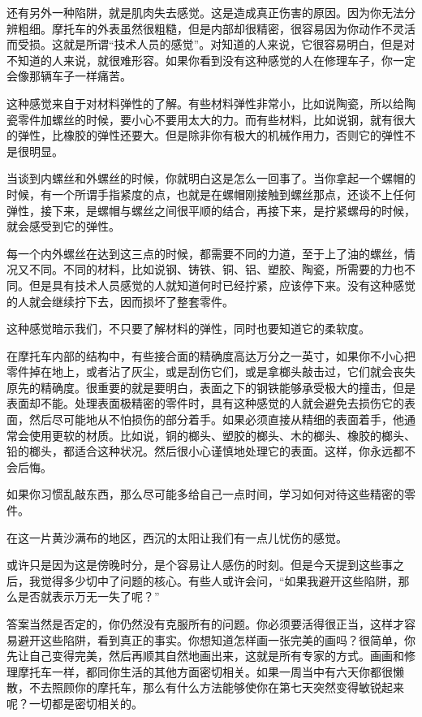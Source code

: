 \documentclass[UTF8]{article}
\begin{document}
\par 还有另外一种陷阱，就是肌肉失去感觉。这是造成真正伤害的原因。因为你无法分辨粗细。摩托车的外表虽然很粗糙，但是内部却很精密，很容易因为你动作不灵活而受损。这就是所谓“技术人员的感觉”。对知道的人来说，它很容易明白，但是对不知道的人来说，就很难形容。如果你看到没有这种感觉的人在修理车子，你一定会像那辆车子一样痛苦。
\par 这种感觉来自于对材料弹性的了解。有些材料弹性非常小，比如说陶瓷，所以给陶瓷零件加螺丝的时候，要小心不要用太大的力。而有些材料，比如说钢，就有很大的弹性，比橡胶的弹性还要大。但是除非你有极大的机械作用力，否则它的弹性不是很明显。
\par 当谈到内螺丝和外螺丝的时候，你就明白这是怎么一回事了。当你拿起一个螺帽的时候，有一个所谓手指紧度的点，也就是在螺帽刚接触到螺丝那点，还谈不上任何弹性，接下来，是螺帽与螺丝之间很平顺的结合，再接下来，是拧紧螺母的时候，就会感受到它的弹性。
\par 每一个内外螺丝在达到这三点的时候，都需要不同的力道，至于上了油的螺丝，情况又不同。不同的材料，比如说钢、铸铁、铜、铝、塑胶、陶瓷，所需要的力也不同。但是具有技术人员感觉的人就知道何时已经拧紧，应该停下来。没有这种感觉的人就会继续拧下去，因而损坏了整套零件。
\par 这种感觉暗示我们，不只要了解材料的弹性，同时也要知道它的柔软度。
\par 在摩托车内部的结构中，有些接合面的精确度高达万分之一英寸，如果你不小心把零件掉在地上，或者沾了灰尘，或是刮伤它们，或是拿榔头敲击过，它们就会丧失原先的精确度。很重要的就是要明白，表面之下的钢铁能够承受极大的撞击，但是表面却不能。处理表面极精密的零件时，具有这种感觉的人就会避免去损伤它的表面，然后尽可能地从不怕损伤的部分着手。如果必须直接从精细的表面着手，他通常会使用更软的材质。比如说，铜的榔头、塑胶的榔头、木的榔头、橡胶的榔头、铅的榔头，都适合这种状况。然后很小心谨慎地处理它的表面。这样，你永远都不会后悔。
\par 如果你习惯乱敲东西，那么尽可能多给自己一点时间，学习如何对待这些精密的零件。
\par 在这一片黄沙满布的地区，西沉的太阳让我们有一点儿忧伤的感觉。
\par 或许只是因为这是傍晚时分，是个容易让人感伤的时刻。但是今天提到这些事之后，我觉得多少切中了问题的核心。有些人或许会问，“如果我避开这些陷阱，那么是否就表示万无一失了呢？”
\par 答案当然是否定的，你仍然没有克服所有的问题。你必须要活得很正当，这样才容易避开这些陷阱，看到真正的事实。你想知道怎样画一张完美的画吗？很简单，你先让自己变得完美，然后再顺其自然地画出来，这就是所有专家的方式。画画和修理摩托车一样，都同你生活的其他方面密切相关。如果一周当中有六天你都很懒散，不去照顾你的摩托车，那么有什么方法能够使你在第七天突然变得敏锐起来呢？一切都是密切相关的。
\end{document}
